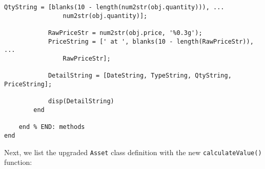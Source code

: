 \begin{lstlisting}[style=Matlab-editor, caption={The \texttt{Transaction} class, as enhanced to support \texttt{Asset} value calculations.}, label={lst:TransactionForCalculations}]
            QtyString = [blanks(10 - length(num2str(obj.quantity))), ...
                num2str(obj.quantity)];
            
            RawPriceStr = num2str(obj.price, '%0.3g');
            PriceString = [' at ', blanks(10 - length(RawPriceStr)), ...
                RawPriceStr];
            
            DetailString = [DateString, TypeString, QtyString, PriceString];
            
            disp(DetailString)
        end
        
    end % END: methods
end
\end{lstlisting}

Next, we list the upgraded \texttt{Asset} class definition with the new \texttt{calculateValue()} function:
